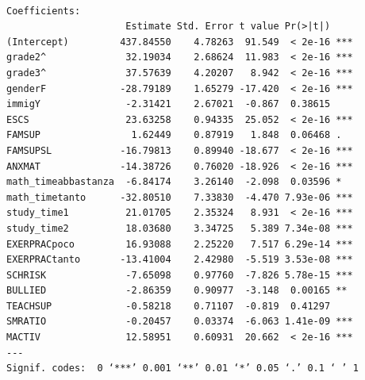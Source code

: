 \documentclass{beamer}
\begin{document}
\begin{frame}[fragile]

{\tiny
\begin{verbatim}

Coefficients:
                     Estimate Std. Error t value Pr(>|t|)    
(Intercept)         437.84550    4.78263  91.549  < 2e-16 ***
grade2^              32.19034    2.68624  11.983  < 2e-16 ***
grade3^              37.57639    4.20207   8.942  < 2e-16 ***
genderF             -28.79189    1.65279 -17.420  < 2e-16 ***
immigY               -2.31421    2.67021  -0.867  0.38615    
ESCS                 23.63258    0.94335  25.052  < 2e-16 ***
FAMSUP                1.62449    0.87919   1.848  0.06468 .  
FAMSUPSL            -16.79813    0.89940 -18.677  < 2e-16 ***
ANXMAT              -14.38726    0.76020 -18.926  < 2e-16 ***
math_timeabbastanza  -6.84174    3.26140  -2.098  0.03596 *  
math_timetanto      -32.80510    7.33830  -4.470 7.93e-06 ***
study_time1          21.01705    2.35324   8.931  < 2e-16 ***
study_time2          18.03680    3.34725   5.389 7.34e-08 ***
EXERPRACpoco         16.93088    2.25220   7.517 6.29e-14 ***
EXERPRACtanto       -13.41004    2.42980  -5.519 3.53e-08 ***
SCHRISK              -7.65098    0.97760  -7.826 5.78e-15 ***
BULLIED              -2.86359    0.90977  -3.148  0.00165 ** 
TEACHSUP             -0.58218    0.71107  -0.819  0.41297    
SMRATIO              -0.20457    0.03374  -6.063 1.41e-09 ***
MACTIV               12.58951    0.60931  20.662  < 2e-16 ***
---
Signif. codes:  0 ‘***’ 0.001 ‘**’ 0.01 ‘*’ 0.05 ‘.’ 0.1 ‘ ’ 1

\end{verbatim}
}
\end{frame}
\end{document}
